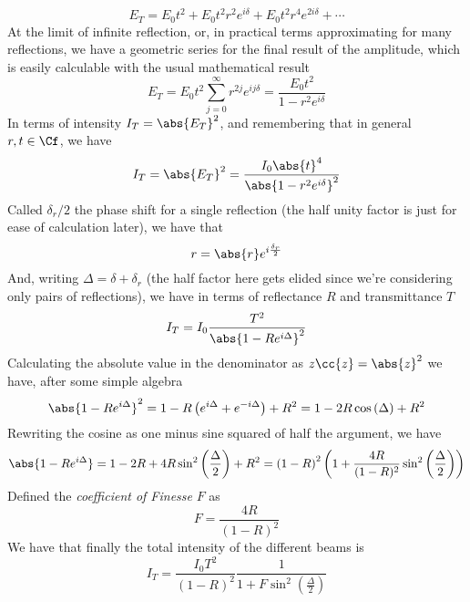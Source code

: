 \documentclass[../electromagnetism.tex]{subfiles}
\begin{document}
\begin{equation*}
	E_T=E_0t^2+E_0t^2r^2e^{i\delta}+E_0t^2r^4e^{2i\delta}+\cdots
\end{equation*}
At the limit of infinite reflection, or, in practical terms approximating for many reflections, we have a geometric series for the final result of the amplitude, which is easily calculable with the usual mathematical result
\begin{equation}
	E_T=E_0t^2\sum_{j=0}^{\infty}r^{2j}e^{ij\delta}=\frac{E_0t^2}{1-r^2e^{i\delta}}
	\label{eq:totalamplitudembi}
\end{equation}
In terms of intensity $I_T=\abs{E_T}^2$, and remembering that in general $r,t\in\Cf$, we have
\begin{equation}
	I_T=\abs{E_T}^2=\frac{I_0\abs{t}^4}{\abs{1-r^2e^{i\delta}}^2}
	\label{eq:intmbibefore}
\end{equation}
Called $\delta_r/2$ the phase shift for a single reflection (the half unity factor is just for ease of calculation later), we have that 
\begin{equation*}
	r=\abs{r}e^{i\frac{\delta_r}{2}}
\end{equation*}
And, writing $\Delta=\delta+\delta_r$ (the half factor here gets elided since we're considering only pairs of reflections), we have in terms of reflectance $R$ and transmittance $T$
\begin{equation*}
	I_T=I_0\frac{T^2}{\abs{1-Re^{i\Delta}}^2}
\end{equation*}
Calculating the absolute value in the denominator as $z\cc{z}=\abs{z}^2$ we have, after some simple algebra
\begin{equation*}
	\abs{1-Re^{i\Delta}}^2=1-R\left( e^{i\Delta}+e^{-i\Delta} \right)+R^2=1-2R\cos\left( \Delta \right)+R^2
\end{equation*}
Rewriting the cosine as one minus sine squared of half the argument, we have
\begin{equation*}
	\abs{1-Re^{i\Delta}}=1-2R+4R\sin^2\left( \frac{\Delta}{2} \right)+R^2=\left( 1-R \right)^2\left( 1+\frac{4R}{(1-R)^2}\sin^2\left( \frac{\Delta}{2} \right) \right)
\end{equation*}
Defined the \emph{coefficient of Finesse} $F$ as 
\begin{equation}
	F=\frac{4R}{(1-R)^2}
	\label{eq:finessecoefficient}
\end{equation}
We have that finally the total intensity of the different beams is 
\begin{equation}
	I_T=\frac{I_0T^2}{(1-R)^2}\frac{1}{1+F\sin^2\left( \frac{\Delta}{2} \right)}
	\label{eq:intensityairymbi}
\end{equation}
\end{document}
